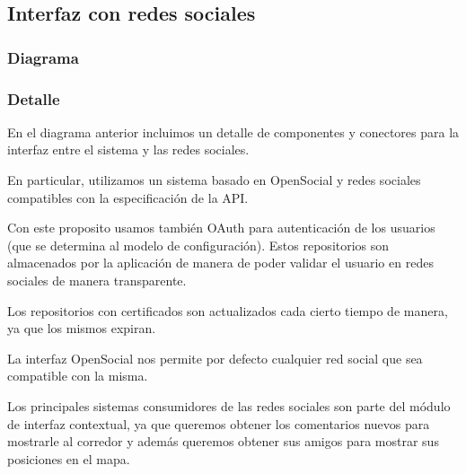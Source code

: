 \subsection{Interfaz con redes sociales}
\subsubsection{Diagrama}


\subsubsection{Detalle}

En el diagrama anterior incluimos un detalle de componentes y 
conectores para la interfaz entre el sistema y las redes sociales.

En particular, utilizamos un sistema basado en OpenSocial y redes
sociales compatibles con la especificación de la API. 

Con este proposito usamos también OAuth para autenticación de los usuarios (que se determina al modelo de configuración). Estos repositorios son almacenados por la aplicación de manera de poder validar el 
usuario en redes sociales de manera transparente. 

Los repositorios con certificados son actualizados cada cierto
tiempo de manera, ya que los mismos expiran.

La interfaz OpenSocial nos permite por defecto cualquier red social
que sea compatible con la misma. 

Los principales sistemas consumidores de las redes sociales son
parte del módulo de interfaz contextual, ya que queremos obtener
los comentarios nuevos para mostrarle al corredor y además
queremos obtener sus amigos para mostrar sus posiciones en el mapa.
